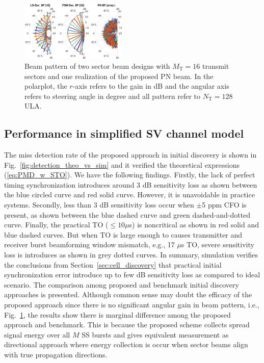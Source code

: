 \documentclass[journal]{IEEEtran}
\newcommand{\tx}[0]{\text{T}}
\begin{document}
\begin{figure}
\begin{center}
\includegraphics[width=0.45\textwidth]{figures/beam_pattern.eps}
\end{center}
\vspace{-4mm}
\caption{Beam pattern of two sector beam designs \cite{6847111,array_textbook} with $M_{\text{T}}=16$ transmit sectors and one realization of the proposed PN beam. In the polarplot, the $r$-axis refers to the gain in dB and the angular axis refers to steering angle in degree and all pattern refer to $N_{\tx} = 128$ ULA.}
\vspace{-4mm}
\label{fig:beam_pattern}
\end{figure}

% 
%
\subsection{Performance in simplified SV channel model}
The miss detection rate of the proposed approach in initial discovery is shown in Fig.~\ref{fig:detection_theo_vs_sim} and it verified the theoretical expressions (\ref{eq:PMD_w_STO}). We have the following findings. Firstly, the lack of perfect timing synchronization introduces around 3 dB sensitivity loss as shown between the blue circled curve and red solid curve. However, it is unavoidable in practice systems. Secondly, less than 3 dB sensitivity loss occur when $\pm$5 ppm CFO is present, as shown between the blue dashed curve and green dashed-and-dotted curve. Finally, the practical TO ($\leq10\mu$s) is noncritical as shown in red solid and blue dashed curves. But when TO is large enough to causes transmitter and receiver burst beamforming window mismatch, e.g., 17 $\mu$s TO, severe sensitivity loss is introduces as shown in grey dotted curves. In summary, simulation verifies the conclusions from Section~\ref{sec:cell_discovery} that practical initial synchronization error introduce up to few dB sensitivity loss as compared to ideal scenario. The comparison among proposed and benchmark initial discovery approaches is presented. Although common sense may doubt the efficacy of the proposed approach since there is no significant angular gain in beam pattern, i.e., Fig.~\ref{fig:beam_pattern}, the results show there is marginal difference among the proposed approach and benchmark. This is because the proposed scheme collects spread signal energy over all $M$ SS bursts and gives equivalent measurement as directional approach where energy collection is occur when sector beams align with true propagation directions.
\end{document}
